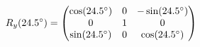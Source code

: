 \documentclass[preview]{standalone}
\begin{document}
\begin{align*}
\special{dvisvgm:raw <g id='unique000'>}R_y(24.5^\circ) = \begin{pmatrix} \cos(24.5^\circ) & 0 & -\sin(24.5^\circ) \\ 0 & 1 & 0 \\ \sin(24.5^\circ) & 0 & \cos(24.5^\circ) \end{pmatrix}\special{dvisvgm:raw </g>}
\end{align*}
\end{document}
